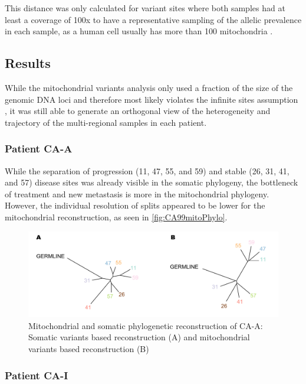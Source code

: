 This distance was only calculated for variant sites where both samples had at least a coverage of 100x to have a representative sampling of the allelic prevalence in each sample, as a human cell usually has more than 100 mitochondria \cite{Cole2016}.


\subsection{Results}
\label{cascade-sec:mitoResults}
While the mitochondrial variants analysis only used a fraction of the size of the genomic DNA loci and therefore most likely violates the infinite sites assumption \cite{Kimura1969}, it was still able to generate an orthogonal view of the heterogeneity and trajectory of the multi-regional samples in each patient.

\subsubsection{Patient CA-A}

While the separation of progression (11, 47, 55, and 59) and stable (26, 31, 41, and 57) disease sites was already visible in the somatic phylogeny, the bottleneck of treatment and new metastasis is more  in the mitochondrial phylogeny. However, the individual resolution of splits appeared to be lower for the mitochondrial reconstruction, as seen in \autoref{fig:CA99mitoPhylo}.


\begin{figure}[h]
\centering
\includegraphics[width=.99\linewidth]{Figures/CASCADE/mito/CA99SomVsMitoPhylo.pdf}
\caption[Mitochondrial and somatic phylogenetic reconstruction of CA-A]{Mitochondrial and somatic phylogenetic reconstruction of CA-A: Somatic variants based reconstruction (A) and mitochondrial variants based reconstruction (B)} \label{fig:CA99mitoPhylo}
\end{figure}

\subsubsection{Patient CA-I}

